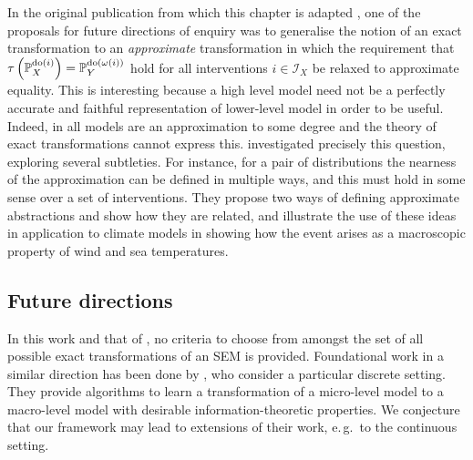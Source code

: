 In the original publication from which this chapter is adapted \citep{rubenstein2017causal}, one of the proposals for future directions of enquiry was to generalise the notion of an exact transformation to an \emph{approximate} transformation in which the requirement that $\tau\left(\mathbb{P}_X^{\operatorname{do}(i)}\right) = \mathbb{P}_Y^{\operatorname{do}(\omega(i))}$ hold for all interventions $i\in \mathcal{I}_X$ be relaxed to approximate equality.
This is interesting because a high level model need not be a perfectly accurate and faithful representation of lower-level model in order to be useful. 
Indeed, in all models are an approximation to some degree and the theory of exact transformations cannot express this.
\cite{sanders2} investigated precisely this question, exploring several subtleties. 
For instance, for a pair of distributions the nearness of the approximation can be defined in multiple ways, and this must hold in some sense over a set of interventions. 
They propose two ways of defining approximate abstractions and show how they are related, and illustrate the use of these ideas in application 
to climate models in showing how the  event arises as a macroscopic property of wind and sea temperatures.


\subsection{Future directions}


In this work and that of \cite{sanders1, sanders2},
no criteria to choose from amongst the set of all possible exact transformations of an SEM is provided.
Foundational work in a similar direction has been done by \cite{chalupka2015visual,chalupka2016multi}, who consider a particular discrete setting.
They provide algorithms to learn a transformation of a micro-level model to a macro-level model with desirable information-theoretic properties.
We conjecture that our framework may lead to extensions of their work, e.\,g.\ to the continuous setting.


